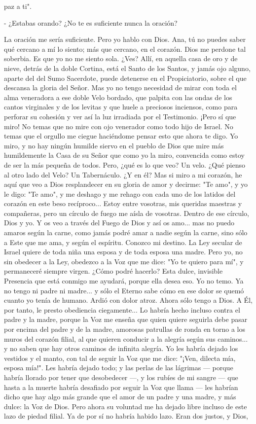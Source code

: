 \documentclass[12pt, twoside, openright]{book} %
\begin{document}
paz a ti". 

- ¿Estabas orando? ¿No te es suficiente nunca la oración? 

La oración me sería suficiente. Pero yo hablo con Dios. Ana, tú no puedes saber qué cercano a mí lo siento; más que cercano, en el corazón. Dios me perdone tal soberbia. Es que yo no me siento sola. ¿Ves? Allí, en aquella casa de oro y de nieve, detrás de la doble Cortina, está el Santo de los Santos, y jamás ojo alguno, aparte del del Sumo Sacerdote, puede detenerse en el Propiciatorio, sobre el que descansa la gloria del Señor. Mas yo no tengo necesidad de mirar con toda el alma veneradora a ese doble Velo bordado, que palpita con las ondas de los cantos virginales y de los levitas y que huele a preciosos inciensos, como para perforar su cohesión y ver así la luz irradiada por el Testimonio. ¡Pero sí que miro! No temas que no mire con ojo venerador como todo hijo de Israel. No temas que el orgullo me ciegue haciéndome pensar esto que ahora te digo. Yo miro, y no hay ningún humilde siervo en el pueblo de Dios que mire más humildemente la Casa de su Señor que como yo la miro, convencida como estoy de ser la más pequeña de todos. Pero, ¿qué es lo que veo? Un velo. ¿Qué pienso al otro lado del Velo? Un Tabernáculo. ¿Y en él? Mas si miro a mi corazón, he aquí que veo a Dios resplandecer en su gloria de amor y decirme: "Te amo", y yo le digo: "Te amo", y me deshago y me rehago con cada uno de los latidos del corazón en este beso recíproco... Estoy entre vosotras, mis queridas maestras y compañeras, pero un círculo de fuego me aísla de vosotras. Dentro de ese círculo, Dios y yo. Y os veo a través del Fuego de Dios y así os amo... mas no puedo amaros según la carne, como jamás podré amar a nadie según la carne, sino sólo a Este que me ama, y según el espíritu. Conozco mi destino. La Ley secular de Israel quiere de toda niña una esposa y de toda esposa una madre. Pero yo, no sin obedecer a la Ley, obedezco a la Voz que me dice: "Yo te quiero para mí", y permaneceré siempre virgen. ¿Cómo podré hacerlo? Esta dulce, invisible Presencia que está conmigo me ayudará, porque ella desea eso. Yo no temo. Ya no tengo ni padre ni madre... y sólo el Eterno sabe cómo en ese dolor se quemó cuanto yo tenía de humano. Ardió con dolor atroz. Ahora sólo tengo a Dios. A Él, por tanto, le presto obediencia ciegamente... Lo habría hecho incluso contra el padre y la madre, porque la Voz me enseña que quien quiere seguirla debe pasar por encima del padre y de la madre, amorosas patrullas de ronda en torno a los muros del corazón filial, al que quieren conducir a la alegría según sus caminos... y no saben que hay otros caminos de infinita alegría. Yo les habría dejado los vestidos y el manto, con tal de seguir la Voz que me dice: "¡Ven, dilecta mía, esposa mía!". Les habría dejado todo; y las perlas de las lágrimas — porque habría llorado por tener que desobedecer —, y los rubíes de mi sangre — que hasta a la muerte habría desafiado por seguir la Voz que llama — les habrían dicho que hay algo más grande que el amor de un padre y una madre, y más dulce: la Voz de Dios. Pero ahora su voluntad me ha dejado libre incluso de este lazo de piedad filial. Ya de por sí no habría habido lazo. Eran dos justos, y Dios, 
\end{document}
